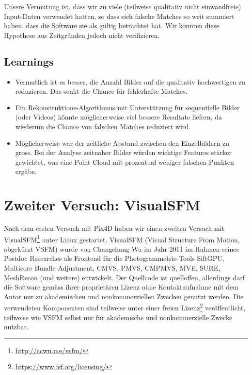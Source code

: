 Unsere Vermutung ist, dass wir zu viele (teilweise qualitativ nicht
einwandfreie) Input-Daten verwendet hatten, so dass sich falsche Matches so weit
summiert haben, dass die Software sie als gültig betrachtet hat. Wir konnten
diese Hypothese aus Zeitgründen jedoch nicht verifizieren.

\subsection{Learnings}

\begin{itemize}
	\item Vermutlich ist es besser, die Anzahl Bilder auf die qualitativ
		hochwertigen zu reduzieren. Das senkt die Chance für fehlerhafte Matches.
	\item Ein Rekonstruktions-Algorithmus mit Unterstützung für sequentielle
		Bilder (oder Videos) könnte möglicherweise viel bessere Resultate liefern,
		da wiederum die Chance von falschen Matches reduziert wird.
	\item Möglicherweise war der zeitliche Abstand zwischen den Einzelbildern
		zu gross. Bei der Analyse zeitnaher Bilder würden wichtige Features
		stärker gewichtet, was eine Point-Cloud mit prozentual weniger
		falschen Punkten ergäbe.
\end{itemize}


\section{Zweiter Versuch: VisualSFM}

\label{workflow:vsfm}

Nach dem ersten Versuch mit Pix4D haben wir einen zweiten Versuch mit
VisualSFM\footnote{\url{http://ccwu.me/vsfm/}}\cite{wu:2011}\cite{wu:2015} unter
Linux gestartet. VisualSFM (Visual Structure From Motion, abgekürzt VSFM) wurde
von Changchang Wu im Jahr 2011 im Rahmen seines Postdoc Researches als Frontend
für die Photogrammetrie-Tools SiftGPU\cite{siftgpu07wu}, Multicore Bundle
Adjustment\cite{wu2011multicore}, CMVS\cite{Furu:2010},
PMVS\cite{Furu:2010:PMVS}, CMPMVS\cite{jancosek2011multi}, MVE\cite{FG-GCH2014},
SURE\cite{rothermel2012sure}, MeshRecon (und weitere) entwickelt. Der Quellcode
ist quelloffen, allerdings darf die Software gemäss ihrer proprietären Lizenz
ohne Kontaktaufnahme mit dem Autor nur zu akademischen und nonkommerziellen
Zwecken genutzt werden. Die verwendeten Komponenten sind teilweise unter einer
freien Lizenz\footnote{\url{https://www.fsf.org/licensing/}} veröffentlicht,
teilweise wie VSFM selbst nur für akademische und nonkommerzielle Zwecke
nutzbar.

